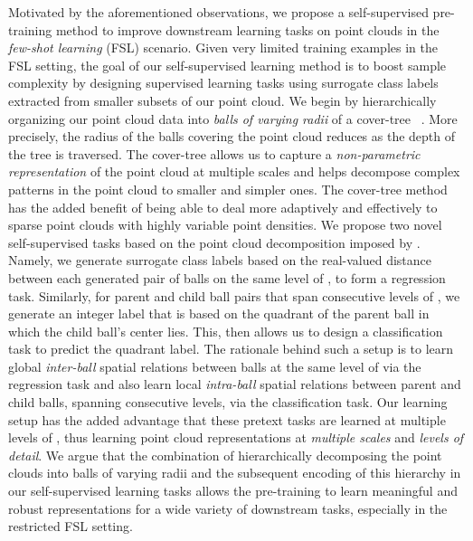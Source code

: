 \documentclass{article}
\begin{document}
Motivated by the aforementioned observations, we propose a self-supervised pre-training method to improve  downstream learning tasks on point clouds in the \emph{few-shot learning} (FSL) scenario.
Given very limited training examples in the FSL setting, the goal of our self-supervised learning method is to boost sample complexity by designing supervised learning tasks using surrogate class labels extracted from smaller subsets of our point cloud. We begin by hierarchically organizing our point cloud data into \emph{balls of varying radii} of a cover-tree ~\cite{beygelzimer2006cover}. More precisely, the radius of the balls covering the point cloud reduces as the depth of the tree is traversed.
The cover-tree  allows us to capture a \emph{non-parametric representation} of the point cloud at multiple scales and helps decompose complex patterns in the point cloud to smaller and simpler ones. 
The cover-tree method has the added benefit of being able to deal more adaptively and effectively to sparse point clouds with highly variable point densities.
We propose two novel self-supervised tasks based on the point cloud decomposition imposed by .
Namely, we generate surrogate class labels based on the real-valued distance between each generated pair of balls on the same level of , to form a regression task. Similarly, for parent and child ball pairs that 
span consecutive levels of , we generate an integer label that is based on the quadrant of the parent ball in which the child ball's center lies. This, then allows us to design a classification task to predict the quadrant label. The rationale behind such a setup is to learn global \emph{inter-ball} spatial relations between balls at the same level of  via the regression task and also learn local \emph{intra-ball} spatial relations between parent and child balls, spanning consecutive levels, via the classification task. 
Our learning setup has the added advantage that these pretext tasks are learned at multiple levels of , thus learning point cloud representations at \emph{multiple scales} and \emph{levels of detail}. 
We argue that the combination of hierarchically decomposing the point clouds into balls of varying radii and the subsequent encoding of this hierarchy in our self-supervised learning tasks allows the pre-training to learn meaningful and robust representations for a wide variety of downstream tasks, especially in the restricted FSL setting.
\end{document}
